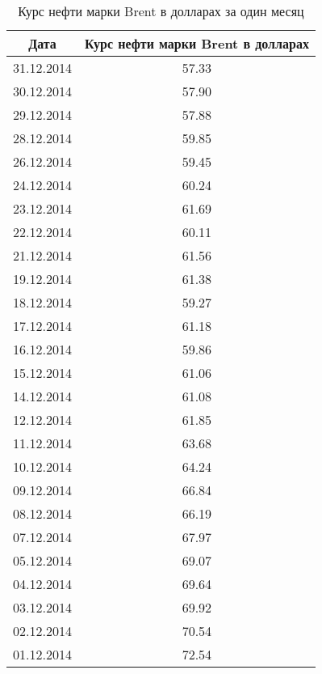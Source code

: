 \documentclass[12pt,a4paper,oneside]{extarticle}
\begin{document}
    \begin{table}[ht!]
        \caption{Курс нефти марки Brent в долларах за один месяц}
        \centering
        \label{tabular:data1}
        \small

        \begin{tabular}{|c|c|}
            \hline
            Дата & Курс нефти марки Brent в долларах \\ \hline
            31.12.2014 & 57.33 \\ \hline 
            30.12.2014 & 57.90 \\ \hline 
            29.12.2014 & 57.88 \\ \hline 
            28.12.2014 & 59.85 \\ \hline 
            26.12.2014 & 59.45 \\ \hline 
            24.12.2014 & 60.24 \\ \hline 
            23.12.2014 & 61.69 \\ \hline 
            22.12.2014 & 60.11 \\ \hline 
            21.12.2014 & 61.56 \\ \hline 
            19.12.2014 & 61.38 \\ \hline 
            18.12.2014 & 59.27 \\ \hline 
            17.12.2014 & 61.18 \\ \hline 
            16.12.2014 & 59.86 \\ \hline 
            15.12.2014 & 61.06 \\ \hline 
            14.12.2014 & 61.08 \\ \hline 
            12.12.2014 & 61.85 \\ \hline 
            11.12.2014 & 63.68 \\ \hline 
            10.12.2014 & 64.24 \\ \hline 
            09.12.2014 & 66.84 \\ \hline 
            08.12.2014 & 66.19 \\ \hline 
            07.12.2014 & 67.97 \\ \hline 
            05.12.2014 & 69.07 \\ \hline 
            04.12.2014 & 69.64 \\ \hline 
            03.12.2014 & 69.92 \\ \hline 
            02.12.2014 & 70.54 \\ \hline 
            01.12.2014 & 72.54 \\ \hline 
        \end{tabular}
    \end{table}
\end{document}

